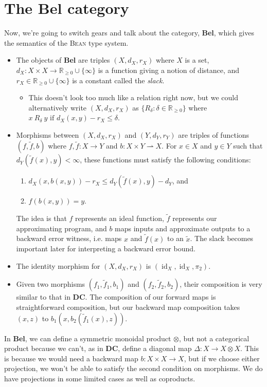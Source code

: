 \documentclass[a4paper]{article}
\newcommand{\DC}{\textbf{DC}}
\newcommand{\Bel}{\textbf{Bel}}
\newcommand{\Bean}{\textsc{Bean}}
\newcommand{\R}{\mathbb{R}}
\DeclareMathOperator{\id}{id}
\begin{document}
\section{The \Bel{} category}
Now, we're going to switch gears and talk about the category, \Bel{}, which gives the semantics of the \Bean{} type system. 
\begin{itemize}
    \item The objects of \Bel{} are triples $(X, d_X,r_X)$ where $X$ is a set, $d_X:X\times X\to \R_{\geq 0}\cup\{\infty\}$ is a function giving a notion of distance, and $r_X\in\R_{\geq 0}\cup\{\infty\}$ is a constant called the \emph{slack}. 
    \begin{itemize}
        \item This doesn't look too much like a relation right now, but we could alternatively write $(X,d_X,r_X)$ as $\{R_\delta:\delta\in\R_{\geq 0}\}$ where $x\ R_\delta\ y\text{ if } d_X(x,y)-r_X\leq \delta$.
    \end{itemize}
    \item Morphisms between $(X,d_X,r_X)$ and $(Y,d_Y,r_Y)$ are triples of functions $(f,\tilde{f},b)$ where $f,\tilde{f}:X\to Y$ and $b:X\times Y\rightharpoonup X$. For $x\in X$ and $y\in Y$ such that $d_Y(\tilde{f}(x),y)<\infty$, these functions must satisfy the following conditions:
    \begin{enumerate}
        \item $d_X(x,b(x,y))-r_X\leq d_Y(\tilde{f}(x),y)-d_Y$, and
        \item $f(b(x,y))=y$.
    \end{enumerate}
    The idea is that $f$ represents an ideal function, $\tilde{f}$ represents our approximating program, and $b$ maps inputs and approximate outputs to a backward error witness, i.e. maps $x$ and $\tilde{f}(x)$ to an $\tilde{x}$. The slack becomes important later for interpreting a backward error bound.
    \item The identity morphism for $(X,d_X,r_X)$ is $(\id_X,\id_X,\pi_2)$.
    \item Given two morphisms $(f_1,\tilde{f}_1,b_1)$ and $(f_2,\tilde{f}_2,b_2)$, their composition is very similar to that in \DC{}. The composition of our forward maps is straightforward composition, but our backward map composition takes $(x,z)$ to $b_1(x,b_2(\tilde{f}_1(x),z))$.
\end{itemize}
In \Bel{}, we can define a symmetric monoidal product $\otimes$, but not a categorical product because we can't, as in \DC{}, define a diagonal map $\Delta:X\to X\otimes X$. This is because we would need a backward map $b:X\times X\to X$, but if we choose either projection, we won't be able to satisfy the second condition on morphisms. We do have projections in some limited cases as well as coproducts.
\end{document}
